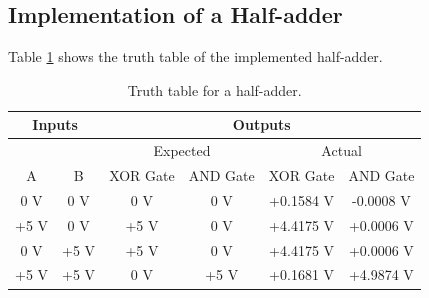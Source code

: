 \documentclass{report}
\begin{document}
	\subsection{Implementation of a Half-adder}
	Table \ref{section4} shows the truth table of the implemented half-adder.
	\begin{table}[h]
		\centering
		\begin{tabular}{@{}cc|cccc@{}}
			\toprule
			\multicolumn{2}{c|}{Inputs}                         & \multicolumn{4}{c}{Outputs}                                           \\ \midrule
			\cellcolor[HTML]{000000} & \cellcolor[HTML]{000000} & \multicolumn{2}{c|}{Expected}            & \multicolumn{2}{c}{Actual} \\ \midrule
			A                        & B                        & XOR Gate & \multicolumn{1}{c|}{AND Gate} & XOR Gate     & AND Gate    \\ \midrule
			0 V                      & 0 V                      & 0 V      & \multicolumn{1}{c|}{0 V}      & +0.1584 V    & -0.0008 V   \\
			+5 V                     & 0 V                      & +5 V     & \multicolumn{1}{c|}{0 V}      & +4.4175 V    & +0.0006 V   \\
			0 V                      & +5 V                     & +5 V     & \multicolumn{1}{c|}{0 V}      & +4.4175 V    & +0.0006 V   \\
			+5 V                     & +5 V                     & 0 V      & \multicolumn{1}{c|}{+5 V}     & +0.1681 V    & +4.9874 V   \\ \bottomrule
		\end{tabular}
		\caption{Truth table for a half-adder.}
		\label{section4}
	\end{table}
	
\end{document}
